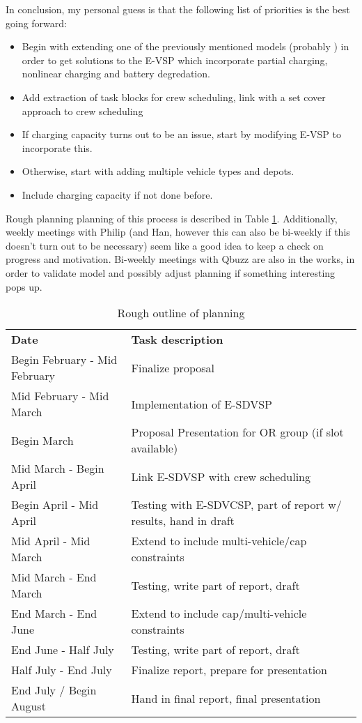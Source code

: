 \documentclass[]{article}
\begin{document}
In conclusion, my personal guess is that the following list of priorities is the best going forward:
\begin{itemize}
  \item Begin with extending one of the previously mentioned models (probably \cite{vanKootenNiekerk2017}) in order to get solutions to the E-VSP which incorporate partial charging, nonlinear charging and battery degredation.
  \item Add extraction of task blocks for crew scheduling, link with a set cover approach to crew scheduling
  \item If charging capacity turns out to be an issue, start by modifying E-VSP to incorporate this. 
  \item Otherwise, start with adding multiple vehicle types and depots. 
  \item Include charging capacity if not done before. 
\end{itemize}
Rough planning planning of this process is described in Table \ref{tab:planning}. Additionally, weekly meetings with Philip (and Han, however this can also be bi-weekly if this doesn't turn out to be necessary) seem like a good idea to keep a check on progress and motivation. Bi-weekly meetings with Qbuzz are also in the works, in order to validate model and possibly adjust planning if something interesting pops up.
\begin{table}[h]
  \centering
  \begin{tabular}{ll}
    \toprule
    \multicolumn{1}{l}{\textbf{Date}} & \multicolumn{1}{l}{\textbf{Task description}}               \\
    \cmidrule(lr){1-1}\cmidrule(lr){2-2}
    Begin February - Mid February & Finalize proposal \\
    Mid February - Mid March & Implementation of E-SDVSP \\
    Begin March & Proposal Presentation for OR group (if slot available) \\
    Mid March - Begin April & Link E-SDVSP with crew scheduling \\ 
    Begin April - Mid April & Testing with E-SDVCSP, part of report w/ results, hand in draft \\
    Mid April - Mid March & Extend to include multi-vehicle/cap constraints \\
    Mid March - End March & Testing, write part of report, draft \\ 
    End March - End June & Extend to include cap/multi-vehicle constraints \\
    End June - Half July & Testing, write part of report, draft \\
    Half July - End July & Finalize report, prepare for presentation \\ 
    End July / Begin August & Hand in final report, final presentation \\ 
    \bottomrule
  \end{tabular}
  \label{tab:planning}
  \caption{Rough outline of planning}
\end{table}

\printbibliography
\end{document}
